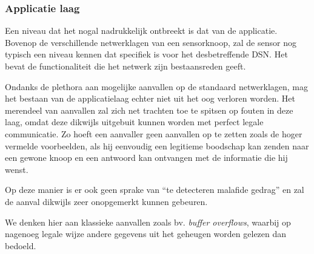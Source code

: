 \subsubsection*{Applicatie laag}

Een niveau dat het nogal nadrukkelijk ontbreekt is dat van de applicatie.
Bovenop de verschillende netwerklagen van een sensorknoop, zal de sensor nog
typisch een niveau kennen dat specifiek is voor het desbetreffende DSN. Het
bevat de functionaliteit die het netwerk zijn bestaansreden geeft.

Ondanks de plethora aan mogelijke aanvallen op de standaard netwerklagen, mag
het bestaan van de applicatielaag echter niet uit het oog verloren worden. Het
merendeel van aanvallen zal zich net trachten toe te spitsen op fouten in deze
laag, omdat deze dikwijls uitgebuit kunnen worden met perfect legale
communicatie. Zo hoeft een aanvaller geen aanvallen op te zetten zoals de hoger
vermelde voorbeelden, als hij eenvoudig een legitieme boodschap kan zenden naar
een gewone knoop en een antwoord kan ontvangen met de informatie die hij wenst.

Op deze manier is er ook geen sprake van ``te detecteren malafide gedrag'' en
zal de aanval dikwijls zeer onopgemerkt kunnen gebeuren.

We denken hier aan klassieke aanvallen zoals bv. \emph{buffer overflows},
waarbij op nagenoeg legale wijze andere gegevens uit het geheugen worden
gelezen dan bedoeld.
